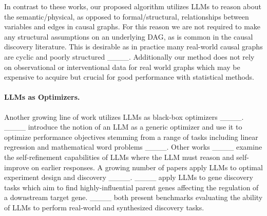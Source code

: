 In contrast to these works, our proposed algorithm utilizes LLMs to reason about the semantic/physical, as opposed to formal/structural, relationships between variables and edges in causal graphs. For this reason we are not required to make any structural assumptions on an underlying DAG, as is common in the causal discovery literature. This is desirable as in practice many real-world causal graphs are cyclic and poorly structured ____. Additionally our method does not rely on observational or interventional data for real world graphs which may be expensive to acquire but crucial for good performance with statistical methods.

\paragraph{LLMs as Optimizers.} Another growing line of work utilizes LLMs as black-box optimizers ____. ____ introduce the notion of an LLM as a generic optimizer and use it to optimize performance objectives stemming from a range of tasks including linear regression and mathematical word problems ____. Other works ____ examine the self-refinement capabilities of LLMs where the LLM must reason and self-improve on earlier responses. A growing number of papers apply LLMs to optimal experiment design and discovery ____. ____ apply LLMs to gene discovery tasks which aim to find highly-influential parent genes affecting the regulation of a downstream target gene. ____ both present benchmarks evaluating the ability of LLMs to perform real-world and synthesized discovery tasks.


